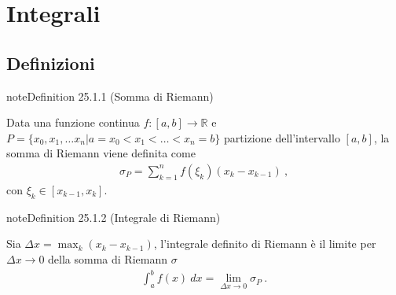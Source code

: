 \documentclass[letterpaper,10pt,italian]{jupyterBook}
\begin{document}
\chapter{Integrali}
\label{\detokenize{ch/infinitesimal_calculus/integrals:integrali}}\label{\detokenize{ch/infinitesimal_calculus/integrals:infinitesimal-calculus-integrals}}\label{\detokenize{ch/infinitesimal_calculus/integrals::doc}}

\section{Definizioni}
\label{\detokenize{ch/infinitesimal_calculus/integrals:definizioni}}\label{\detokenize{ch/infinitesimal_calculus/integrals:infinitesimal-calculus-integrals-def}}\label{ch/infinitesimal_calculus/integrals:infinitesimal-calculus:integrals:def:riemann-sum}
\begin{sphinxadmonition}{note}{Definition 25.1.1 (Somma di Riemann)}



\sphinxAtStartPar
Data una funzione continua \(f: [a,b] \rightarrow \mathbb{R}\) e \(P = \{ x_0, x_1, \dots x_n | a = x_0 < x_1 < \dots < x_n = b \}\) partizione dell’intervallo \([a,b]\), la somma di Riemann viene definita come
\begin{equation}\label{equation:ch/infinitesimal_calculus/integrals:infinitesimal-calculus:integrals:riemann:sum}
\begin{split}\sigma_P = \sum_{k=1}^{n} f(\xi_k) (x_{k} - x_{k-1}) \ ,\end{split}
\end{equation}
\sphinxAtStartPar
con \(\xi_k \in [x_{k-1}, x_k]\).
\end{sphinxadmonition}
\label{ch/infinitesimal_calculus/integrals:infinitesimal-calculus:integrals:def:riemann-integral}
\begin{sphinxadmonition}{note}{Definition 25.1.2 (Integrale di Riemann)}



\sphinxAtStartPar
Sia \(\Delta x = \max_k (x_{k} - x_{k-1})\), l’integrale definito di Riemann è  il limite per \(\Delta x \rightarrow 0\) della somma di Riemann \(\sigma\)
\begin{equation}\label{equation:ch/infinitesimal_calculus/integrals:infinitesimal-calculus:integrals:riemann:def}
\begin{split}\int_a^b f(x) \ dx = \lim_{\Delta x \rightarrow 0} \sigma_P \ .\end{split}
\end{equation}\end{sphinxadmonition}
\end{document}
